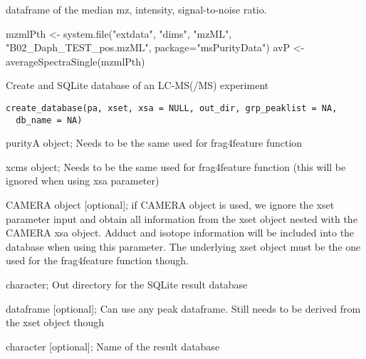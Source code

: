 \documentclass[letterpaper]{book}
\begin{document}
%
\begin{Value}
dataframe of the median mz, intensity, signal-to-noise ratio.
\end{Value}
%
\begin{Examples}
\begin{ExampleCode}
mzmlPth <- system.file("extdata", "dims", "mzML", "B02_Daph_TEST_pos.mzML", package="msPurityData")
avP <- averageSpectraSingle(mzmlPth)
\end{ExampleCode}
\end{Examples}
%
\begin{Description}\relax
Create and SQLite database of an LC-MS(/MS) experiment
\end{Description}
%
\begin{Usage}
\begin{verbatim}
create_database(pa, xset, xsa = NULL, out_dir, grp_peaklist = NA,
  db_name = NA)
\end{verbatim}
\end{Usage}
%
\begin{Arguments}
\begin{ldescription}
\item[\code{pa}] purityA object; Needs to be the same used for frag4feature function

\item[\code{xset}] xcms object; Needs to be the same used for frag4feature function (this will be ignored when using xsa parameter)

\item[\code{xsa}] CAMERA object [optional]; if CAMERA object is used, we ignore the xset parameter input and obtain all information
from the xset object nested with the CAMERA xsa object. Adduct and isotope information
will be included into the database when using this parameter. The underlying xset object must
be the one used for the frag4feature function though.

\item[\code{out\_dir}] character; Out directory for the SQLite result database

\item[\code{grp\_peaklist}] dataframe [optional]; Can use any peak dataframe. Still needs to be derived from the xset object though

\item[\code{db\_name}] character [optional]; Name of the result database
\end{ldescription}
\end{Arguments}
\end{document}
